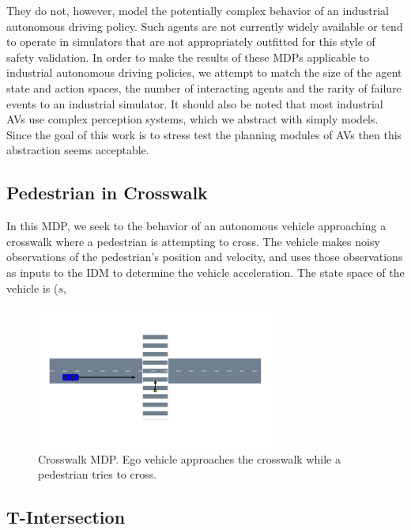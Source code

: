 They do not, however, model the potentially complex behavior of an industrial autonomous driving policy. Such agents are not currently widely available or tend to operate in simulators that are not appropriately outfitted for this style of safety validation. In order to make the results of these MDPs applicable to industrial autonomous driving policies, we attempt to match the size of the agent state and action spaces, the number of interacting agents and the rarity of failure events to an industrial simulator. It should also be noted that most industrial AVs use complex perception systems, which we abstract with simply models. Since the goal of this work is to stress test the planning modules of AVs then this abstraction seems acceptable.





\subsection{Pedestrian in Crosswalk}
In this MDP, we seek to the behavior of an autonomous vehicle approaching a crosswalk where a pedestrian is attempting to cross. The vehicle makes noisy observations of the pedestrian's position and velocity, and uses those observations as inputs to the IDM to determine the vehicle acceleration. The state space of the vehicle is ($s$,  

\begin{figure}
    \centering
    \includegraphics[width=0.7\textwidth]{figures/sample_systems/pedestrian_crosswalk.pdf}
    \caption{Crosswalk MDP. Ego vehicle approaches the crosswalk while a pedestrian tries to cross. }
    \label{fig:pedestrian_crosswalk}
\end{figure}

\subsection{T-Intersection}

